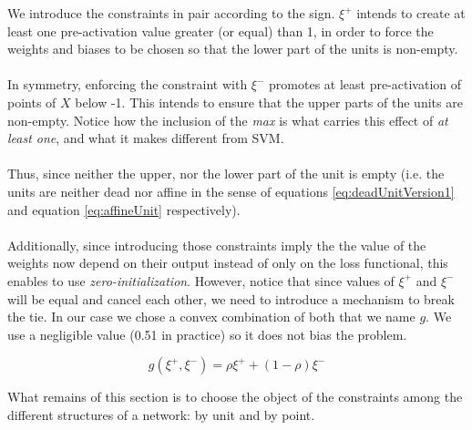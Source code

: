We introduce the constraints in pair according to the sign. $\xi^{+}$ intends to create at least one pre-activation value greater (or equal) than 1, in order to force the weights and biases to be chosen so that the lower part of the units is non-empty. 
\\\\
In symmetry, enforcing the constraint with $\xi^{-}$ promotes at least pre-activation of points of $X$ below -1. This intends to ensure that the upper parts of the units are non-empty. Notice how the inclusion of the \emph{max} is what carries this effect of \emph{at least one}, and what it makes different from SVM.
\\\\
Thus, since neither the upper, nor the lower part of the unit is empty (i.e. the units are neither dead nor affine in the sense of equations \ref{eq:deadUnitVersion1} and equation \ref{eq:affineUnit} respectively).
\\\\
Additionally, since introducing those constraints imply the the value of the weights now depend on their output instead of only on the loss functional, this enables to use \emph{zero-initialization}. However, notice that since values of $\xi^+$ and $\xi^-$ will be equal and cancel each other, we need to introduce a mechanism to break the tie. In our case we chose a convex combination of both that we name $g$. We use a negligible value (0.51 in practice) so it does not bias the problem.

\begin{equation}\label{eq:definitionOfRho}
    g(\xi^{+},\xi^{-}) = \rho\xi^{+}+(1-\rho)\xi^{-}
\end{equation}

What remains of this section is to choose the object of the constraints among the different structures of a network: by unit and by point.

